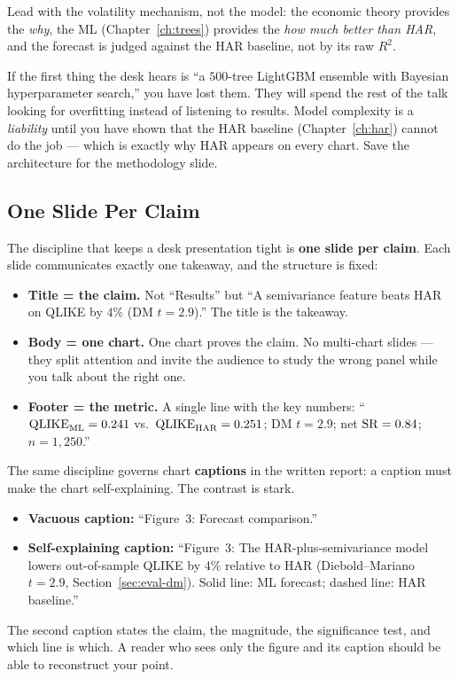 \begin{keyidea}
Lead with the volatility mechanism, not the model: the economic theory provides the \emph{why}, the ML (Chapter~\ref{ch:trees}) provides the \emph{how much better than HAR}, and the forecast is judged against the HAR baseline, not by its raw $R^2$.
\end{keyidea}

\begin{warning}
If the first thing the desk hears is ``a $500$-tree LightGBM ensemble with Bayesian hyperparameter search,'' you have lost them. They will spend the rest of the talk looking for overfitting instead of listening to results. Model complexity is a \emph{liability} until you have shown that the HAR baseline (Chapter~\ref{ch:har}) cannot do the job --- which is exactly why HAR appears on every chart. Save the architecture for the methodology slide.
\end{warning}

\subsection{One Slide Per Claim}
\label{subsec:one-slide}

The discipline that keeps a desk presentation tight is \textbf{one slide per claim}. Each slide communicates exactly one takeaway, and the structure is fixed:
\begin{itemize}[leftmargin=1.5em]
  \item \textbf{Title = the claim.} Not ``Results'' but ``A semivariance feature beats HAR on QLIKE by $4\%$ ($\text{DM } t = 2.9$).'' The title is the takeaway.
  \item \textbf{Body = one chart.} One chart proves the claim. No multi-chart slides --- they split attention and invite the audience to study the wrong panel while you talk about the right one.
  \item \textbf{Footer = the metric.} A single line with the key numbers: ``$\operatorname{QLIKE}_{\text{ML}} = 0.241$ vs.\ $\operatorname{QLIKE}_{\text{HAR}} = 0.251$; DM $t = 2.9$; net $\operatorname{SR} = 0.84$; $n = 1{,}250$.''
\end{itemize}

The same discipline governs chart \textbf{captions} in the written report: a caption must make the chart self-explaining. The contrast is stark.
\begin{itemize}[leftmargin=1.5em]
  \item \textbf{Vacuous caption:} ``Figure~3: Forecast comparison.''
  \item \textbf{Self-explaining caption:} ``Figure~3: The HAR-plus-semivariance model lowers out-of-sample QLIKE by $4\%$ relative to HAR (Diebold--Mariano $t = 2.9$, Section~\ref{sec:eval-dm}). Solid line: ML forecast; dashed line: HAR baseline.''
\end{itemize}
The second caption states the claim, the magnitude, the significance test, and which line is which. A reader who sees only the figure and its caption should be able to reconstruct your point.


